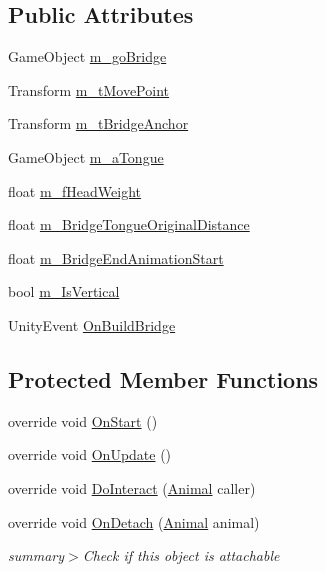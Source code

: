 \subsection*{Public Attributes}
\begin{DoxyCompactItemize}
\item 
Game\+Object \mbox{\hyperlink{class_bridge_maker_aa0754a0cca5b4eec8d5c2499ea686585}{m\+\_\+go\+Bridge}}
\item 
Transform \mbox{\hyperlink{class_bridge_maker_a48e84bd735a7502381ca3c9643f9ddee}{m\+\_\+t\+Move\+Point}}
\item 
Transform \mbox{\hyperlink{class_bridge_maker_a913b130db8c564a77b4b9a6b574193ab}{m\+\_\+t\+Bridge\+Anchor}}
\item 
Game\+Object \mbox{\hyperlink{class_bridge_maker_a489b2a9b18690bb1f700d4ff68a348fa}{m\+\_\+a\+Tongue}}
\item 
float \mbox{\hyperlink{class_bridge_maker_a9b028952ab2da7f925ff7d800ac36d86}{m\+\_\+f\+Head\+Weight}}
\item 
float \mbox{\hyperlink{class_bridge_maker_a888d30d1a8a79526a5bbff7cd1ccc519}{m\+\_\+\+Bridge\+Tongue\+Original\+Distance}}
\item 
float \mbox{\hyperlink{class_bridge_maker_a9c58da197b7f29a9b3db6568a4d97a71}{m\+\_\+\+Bridge\+End\+Animation\+Start}}
\item 
bool \mbox{\hyperlink{class_bridge_maker_ad55b41d1c790535433258f43e433e4af}{m\+\_\+\+Is\+Vertical}}
\item 
Unity\+Event \mbox{\hyperlink{class_bridge_maker_a574e911b6ef9a75d85919380a5245d6b}{On\+Build\+Bridge}}
\end{DoxyCompactItemize}
\subsection*{Protected Member Functions}
\begin{DoxyCompactItemize}
\item 
override void \mbox{\hyperlink{class_bridge_maker_a5aeea9e7555a542ec1d1fab4e3a9126f}{On\+Start}} ()
\item 
override void \mbox{\hyperlink{class_bridge_maker_a6c7c0e10a22698192076b53c8bc55d07}{On\+Update}} ()
\item 
override void \mbox{\hyperlink{class_bridge_maker_a667e3fa3514b0256b73ce3149dabaf90}{Do\+Interact}} (\mbox{\hyperlink{class_animal}{Animal}} caller)
\item 
override void \mbox{\hyperlink{class_bridge_maker_a5d9583fb209bfca47eabb33ce0bbe1bf}{On\+Detach}} (\mbox{\hyperlink{class_animal}{Animal}} animal)
\begin{DoxyCompactList}\small\item\em summary$>$Check if this object is attachable\end{DoxyCompactList}\end{DoxyCompactItemize}
